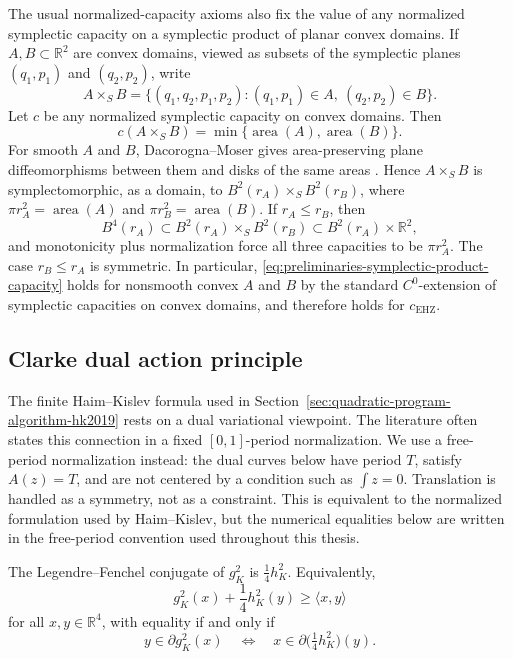 The usual normalized-capacity axioms also fix the value of any normalized
symplectic capacity on a symplectic product of planar convex domains. If
\(A,B\subset\mathbb{R}^2\) are convex domains, viewed as subsets of the
symplectic planes \((q_1,p_1)\) and \((q_2,p_2)\), write
\[
  A\times_S B
  =
  \{(q_1,q_2,p_1,p_2):(q_1,p_1)\in A,\ (q_2,p_2)\in B\}.
\]
Let \(c\) be any normalized symplectic capacity on convex domains. Then
\begin{equation}\label{eq:preliminaries-symplectic-product-capacity}
  c(A\times_S B)
  =
  \min\{\operatorname{area}(A),\operatorname{area}(B)\}.
\end{equation}
For smooth \(A\) and \(B\), Dacorogna--Moser gives area-preserving plane
diffeomorphisms between them and disks of the same areas
\cite{DacorognaMoser1990}. Hence \(A\times_SB\) is symplectomorphic, as a
domain, to
\(B^2(r_A)\times_S B^2(r_B)\), where
\(\pi r_A^2=\operatorname{area}(A)\) and
\(\pi r_B^2=\operatorname{area}(B)\). If \(r_A\leq r_B\), then
\[
  B^4(r_A)
  \subset
  B^2(r_A)\times_S B^2(r_B)
  \subset
  B^2(r_A)\times\mathbb{R}^2,
\]
and monotonicity plus normalization force all three capacities to be
\(\pi r_A^2\). The case \(r_B\leq r_A\) is symmetric. In particular,
\eqref{eq:preliminaries-symplectic-product-capacity} holds for nonsmooth
convex \(A\) and \(B\) by the standard \(C^0\)-extension of symplectic
capacities on convex domains, and therefore holds for \(c_{\mathrm{EHZ}}\).

\subsection{Clarke dual action principle}\label{subsec:preliminaries-clarke-dual-action-principle}

The finite Haim--Kislev formula used in
Section~\ref{sec:quadratic-program-algorithm-hk2019} rests on a dual
variational viewpoint. The literature often states this connection in a fixed
\([0,1]\)-period normalization. We use a free-period normalization instead:
the dual curves below have period \(T\), satisfy \(A(z)=T\), and are not
centered by a condition such as \(\int z=0\). Translation is handled as a
symmetry, not as a constraint. This is equivalent to the normalized formulation
used by Haim--Kislev, but the numerical equalities below are written in the
free-period convention used throughout this thesis.

\begin{lemma}\label{lem:preliminaries-fenchel-duality}
The Legendre--Fenchel conjugate of \(g_K^2\) is
\(\frac{1}{4}h_K^2\). Equivalently,
\[
  g_K^2(x) + \frac{1}{4}h_K^2(y) \geq \langle x,y\rangle
\]
for all \(x,y\in\mathbb{R}^4\), with equality if and only if
\[
  y\in \partial g_K^2(x)
  \quad\Longleftrightarrow\quad
  x\in \partial\bigl(\tfrac{1}{4}h_K^2\bigr)(y).
\]
\end{lemma}

